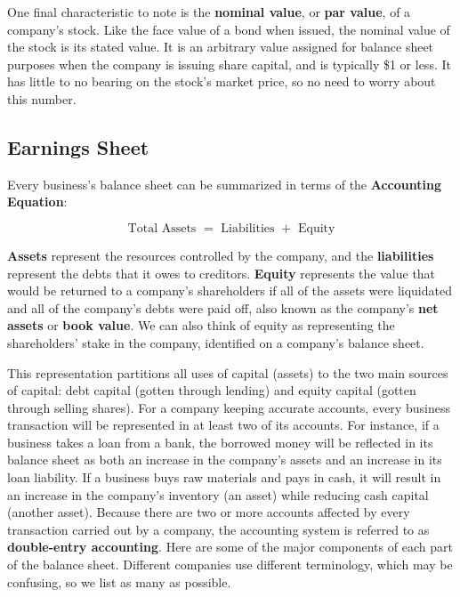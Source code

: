 \documentclass{article}
\begin{document}
    \begin{definition}
      \label{def:nominal-value}
      One final characteristic to note is the \textbf{nominal value}, or \textbf{par value}, of a company's stock. Like the face value of a bond when issued, the nominal value of the stock is its stated value. It is an arbitrary value assigned for balance sheet purposes when the company is issuing share capital, and is typically \$1 or less. It has little to no bearing on the stock's market price, so no need to worry about this number.
    \end{definition}

  \subsection{Earnings Sheet}

    Every business's balance sheet can be summarized in terms of the \textbf{Accounting Equation}:

    \begin{equation}
      \text{Total Assets } = \text{ Liabilities } + \text{ Equity}
    \end{equation}

    \textbf{Assets} represent the resources controlled by the company, and the \textbf{liabilities} represent the debts that it owes to creditors. \textbf{Equity} represents the value that would be returned to a company's shareholders if all of the assets were liquidated and all of the company's debts were paid off, also known as the company's \textbf{net assets} or \textbf{book value}. We can also think of equity as representing the shareholders' stake in the company, identified on a company's balance sheet.

    This representation partitions all uses of capital (assets) to the two main sources of capital: debt capital (gotten through lending) and equity capital (gotten through selling shares). For a company keeping accurate accounts, every business transaction will be represented in at least two of its accounts. For instance, if a business takes a loan from a bank, the borrowed money will be reflected in its balance sheet as both an increase in the company's assets and an increase in its loan liability. If a business buys raw materials and pays in cash, it will result in an increase in the company's inventory (an asset) while reducing cash capital (another asset). Because there are two or more accounts affected by every transaction carried out by a company, the accounting system is referred to as \textbf{double-entry accounting}. Here are some of the major components of each part of the balance sheet. Different companies use different terminology, which may be confusing, so we list as many as possible.
\end{document}
